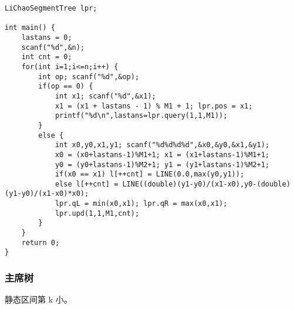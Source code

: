 \documentclass[UTF8]{ctexart}
\begin{document}
\begin{framed}
\begin{lstlisting}
LiChaoSegmentTree lpr;

int main() {
    lastans = 0;
    scanf("%d",&n);
    int cnt = 0;
    for(int i=1;i<=n;i++) {
        int op; scanf("%d",&op);
        if(op == 0) {
            int x1; scanf("%d",&x1);
            x1 = (x1 + lastans - 1) % M1 + 1; lpr.pos = x1;
            printf("%d\n",lastans=lpr.query(1,1,M1));
        }
        else {
            int x0,y0,x1,y1; scanf("%d%d%d%d",&x0,&y0,&x1,&y1);
            x0 = (x0+lastans-1)%M1+1; x1 = (x1+lastans-1)%M1+1;
            y0 = (y0+lastans-1)%M2+1; y1 = (y1+lastans-1)%M2+1;
            if(x0 == x1) l[++cnt] = LINE(0.0,max(y0,y1));
            else l[++cnt] = LINE((double)(y1-y0)/(x1-x0),y0-(double)(y1-y0)/(x1-x0)*x0);
            lpr.qL = min(x0,x1); lpr.qR = max(x0,x1);
            lpr.upd(1,1,M1,cnt);
        }
    }
    return 0;
}
\end{lstlisting}
\end{framed}

\subsubsection{主席树}
静态区间第 k 小。
\end{document}

